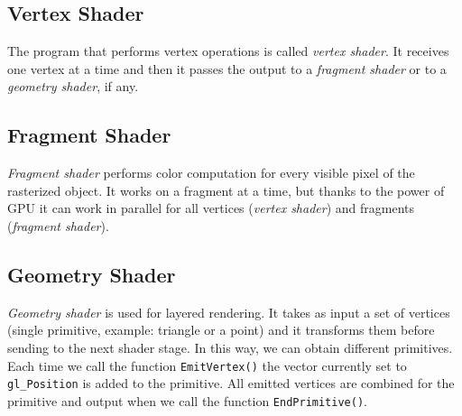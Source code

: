 \subsection{Vertex Shader}
The program that performs vertex operations is called \textit{vertex shader}. It receives one vertex at a time and then it passes the output to a \textit{fragment shader} or to a \textit{geometry shader}, if any.

\subsection{Fragment Shader}
\textit{Fragment shader} performs color computation for every visible pixel of the rasterized object. It works on a fragment at a time, but thanks to the power of GPU it can work in parallel for all vertices (\textit{vertex shader}) and fragments (\textit{fragment shader}).

\subsection{Geometry Shader}
\textit{Geometry shader} is used for layered rendering. It takes as input a set of vertices (single primitive, example: triangle or a point) and it transforms them before sending to the next shader stage. In this way, we can obtain different primitives.
Each time we call the function \texttt{EmitVertex()} the vector currently set to \texttt{gl\_Position} is added to the primitive. All emitted vertices are combined for the primitive and output when we call the function \texttt{EndPrimitive()}.
\cite{WEBSITE:learnopengl}
